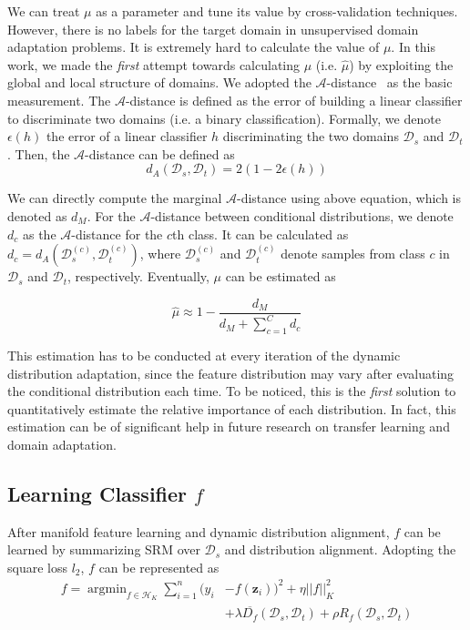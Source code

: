 \documentclass[sigconf]{acmart}
\begin{document}
We can treat $\mu$ as a parameter and tune its value by cross-validation techniques. However, there is no labels for the target domain in unsupervised domain adaptation problems. It is extremely hard to calculate the value of $\mu$. In this work, we made the \textit{first} attempt towards calculating $\mu$ (i.e. $\hat{\mu}$) by exploiting the global and local structure of domains. We adopted the $\mathcal{A}$-distance~\cite{ben2007analysis} as the basic measurement. The $\mathcal{A}$-distance is defined as the error of building a linear classifier to discriminate two domains (i.e. a binary classification). Formally, we denote $\epsilon(h)$ the error of a linear classifier $h$ discriminating the two domains $\mathcal{D}_s$ and $\mathcal{D}_t$. Then, the $\mathcal{A}$-distance can be defined as
\begin{equation}
	d_A(\mathcal{D}_s,\mathcal{D}_t) = 2(1 - 2 \epsilon(h))
\end{equation}

We can directly compute the marginal $\mathcal{A}$-distance using above equation, which is denoted as $d_M$. For the $\mathcal{A}$-distance between conditional distributions, we denote $d_c$ as the $\mathcal{A}$-distance for the $c$th class. It can be calculated as $d_c = d_A(\mathcal{D}^{(c)}_s,\mathcal{D}^{(c)}_t)$, where $\mathcal{D}^{(c)}_s$ and $\mathcal{D}^{(c)}_t$ denote samples from class $c$ in $\mathcal{D}_s$ and $\mathcal{D}_t$, respectively. Eventually, $\mu$ can be estimated as

\begin{equation}
	\label{eq-mu}
	\hat{\mu} \approx 1 - \frac{d_M}{d_M + \sum_{c=1}^{C} d_c}
\end{equation}

This estimation has to be conducted at every iteration of the dynamic distribution adaptation, since the feature distribution may vary after evaluating the conditional distribution each time. 
To be noticed, this is the \textit{first} solution to quantitatively estimate the relative importance of each distribution. In fact, this estimation can be of significant help in future research on transfer learning and domain adaptation.

\subsection{Learning Classifier $f$}

After manifold feature learning and dynamic distribution alignment, $f$ can be learned by summarizing SRM over $\mathcal{D}_s$ and distribution alignment. Adopting the square loss $l_2$, $f$ can be represented as
\begin{equation}
	\label{equ-f}
	\begin{split}
		f = \mathop{\arg\min}_{f \in \mathcal{H}_{K}} \sum_{i=1}^{n} (y_i &- f(\mathbf{z}_i))^2 + \eta ||f||^2_K \\
		&+ \lambda \overline{D_f}(\mathcal{D}_s,\mathcal{D}_t) + \rho R_f(\mathcal{D}_s,\mathcal{D}_t)
	\end{split}
\end{equation}
\end{document}
